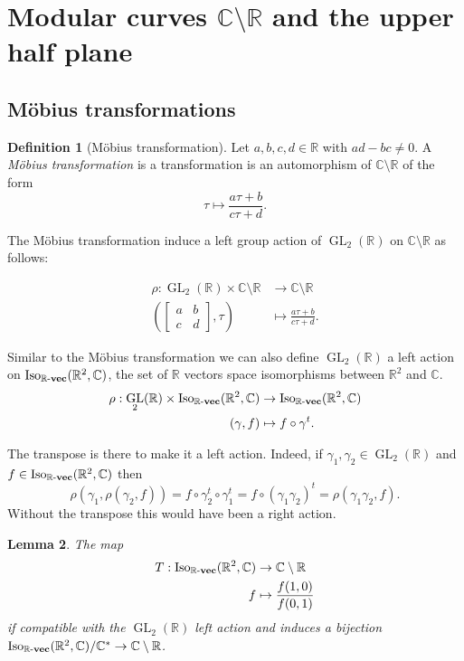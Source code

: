 \documentclass[a4paper,12pt,reqno]{amsart}
\newcommand{\field}[1]{\mathbb{#1}}  %
\newcommand{\R}{\field{R}} %
\newcommand{\C}{\field{C}} %
\newcommand{\IsoKVec}[1]{\mathrm{Iso}_{#1 {\bf\text{-}vec}}}
\newcommand{\transpose}{t}
\DeclareMathOperator{\GL}{GL}
\newtheorem{lemma}{Lemma}
\theoremstyle{definition}
\newtheorem{definition}[lemma]{Definition}
\numberwithin{lemma}{section}
\numberwithin{equation}{section}
\numberwithin{figure}{section}
\begin{document}
\section{Modular curves $\C\setminus \R$ and the upper half plane}



\subsection{M\"obius transformations}


\begin{definition}[M\"obius transformation]\label{def:mobius-transformation}
Let $a,b,c,d \in \R$ with $ad-bc \neq 0$. A \textit{M\"obius transformation} is a transformation is an automorphism of $\C\setminus \R$ of the form
$$ \tau \mapsto \frac {a\tau+b} {c\tau +d}.$$

The M\"obius transformation induce a left group action of $\GL_2(\R)$ on $\C\setminus \R$ as follows:

\begin{align}
\rho :  \GL_2(\R) \times \C\setminus \R &\to \C\setminus \R \\
\left(\begin{bmatrix}
a & b \\ 
c & d
\end{bmatrix}  ,\tau\right) &\mapsto  \frac {a\tau+b} {c\tau +d}.
\end{align}
\end{definition}


Similar to the M\"obius transformation we can also define  $\GL_2(\R)$ a left action on $\IsoKVec{\R}(\R^2,\C)$, the set of $\R$ vectors space isomorphisms between $\R^2$ and $\C$.
\begin{align}
\rho :  \GL_2(\R) \times \IsoKVec{\R}(\R^2,\C) &\to \IsoKVec{\R}(\R^2,\C) \\
\left( \gamma  , f \right) &\mapsto  f \circ \gamma^\transpose.
\end{align}

The transpose is there to make it a left action.  Indeed, if $\gamma_1,\gamma_2 \in \GL_2(\R)$ and $f \in  \IsoKVec{\R}(\R^2,\C)$ then $$\rho(\gamma_1,\rho(\gamma_2,f))=f \circ \gamma_2^\transpose \circ \gamma_1^\transpose = f \circ (\gamma_1 \gamma_2)^\transpose = \rho(\gamma_1\gamma_2,f).$$ Without the transpose this would have been a right action. 

\begin{lemma}
The map 
\begin{align}T  :\IsoKVec{\R}(\R^2,\C) &\to \C \setminus \R\\
                             f &\mapsto \frac {f(1,0)}{f(0,1)}
\end{align}
if compatible with the $\GL_2(\R)$ left action and induces a bijection $\IsoKVec{\R}(\R^2,\C)/\C^* \to \C \setminus \R$.
\end{lemma}
\end{document}
